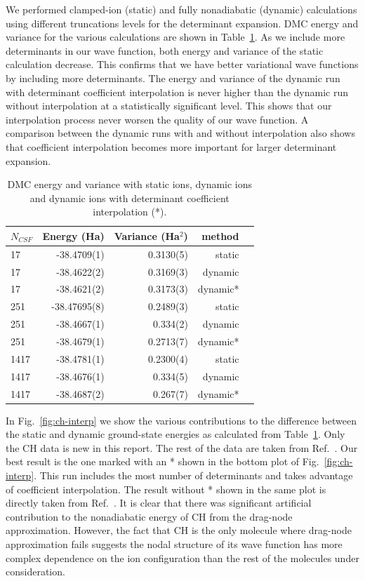 \documentclass[aip,jcp,numerical,reprint]{revtex4-1}
\begin{document}
We performed clamped-ion (static) and fully nonadiabatic (dynamic) calculations using different truncations levels for the determinant expansion. DMC energy and variance for the various calculations are shown in Table~\ref{tab:energy}. As we include more determinants in our wave function, both energy and variance of the static calculation decrease. This confirms that we have better variational wave functions by including more determinants. The energy and variance of the dynamic run with determinant coefficient interpolation is never higher than the dynamic run without interpolation at a statistically significant level. This shows that our interpolation process never worsen the quality of our wave function. A comparison between the dynamic runs with and without interpolation also shows that coefficient interpolation becomes more important for larger determinant expansion.

\begin{table}[h]
\begin{tabular}{lrrrl}
\hline\hline
$N_{CSF}$ & Energy (Ha) & Variance (Ha$^2$) & method \\
\hline
17   & -38.4709(1) &  0.3130(5) &    static \\
17   & -38.4622(2) &  0.3169(3) &   dynamic \\
17   & -38.4621(2) &  0.3173(3) &  dynamic* \\
251  & -38.47695(8)&  0.2489(3) &    static \\
251  & -38.4667(1) &  0.334(2)  &   dynamic \\
251  & -38.4679(1) &  0.2713(7) &  dynamic* \\
1417 & -38.4781(1) &  0.2300(4) &    static \\
1417 & -38.4676(1) &  0.334(5)  &   dynamic \\
1417 & -38.4687(2) &  0.267(7)  &  dynamic* \\
\hline\hline
\end{tabular}
\caption{DMC energy and variance with static ions, dynamic ions and dynamic ions with determinant coefficient interpolation (*).\label{tab:energy}}
\end{table}

In Fig.~\ref{fig:ch-interp} we show the various contributions to the difference between the static and dynamic ground-state energies as calculated from Table~\ref{tab:energy}. Only the CH data is new in this report. The rest of the data are taken from Ref.~\cite{Yang2015}. Our best result is the one marked with an * shown in the bottom plot of Fig.~\ref{fig:ch-interp}. This run includes the most number of determinants and takes advantage of coefficient interpolation. The result without * shown in the same plot is directly taken from Ref.~\cite{Yang2015}. It is clear that there was significant artificial contribution to the nonadiabatic energy of CH from the drag-node approximation. However, the fact that CH is the only molecule where drag-node approximation fails suggests the nodal structure of its wave function has more complex dependence on the ion configuration than the rest of the molecules under consideration.
\end{document}
